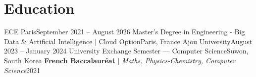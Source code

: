 \section{Education}
  \resumeSubHeadingListStart
    \resumeSubheading
      {ECE Paris}{September 2021 -- August 2026}
      {Master's Degree in Engineering - Big Data \& Artificial Intelligence $|$ Cloud Option}{Paris, France}
      \vspace{2pt}
    \resumeSubheading
      {Ajou University}{August 2023 -- January 2024}
      {University Exchange Semester — Computer Science}{Suwon, South Korea}
      \vspace{2pt}
    \resumeProjectHeading
      {\textbf{French Baccalauréat} $|$ \textit{Maths, Physics-Chemistry, Computer Science}}{2021}
  \resumeSubHeadingListEnd
